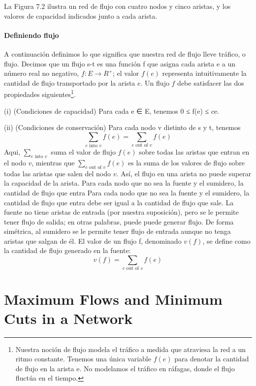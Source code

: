 \documentclass[a4paper, 12pt]{book}
\begin{document}
La Figura 7.2 ilustra un red de flujo con cuatro nodos y cinco aristas, y los valores de capacidad indicados junto a cada arista.

\paragraph{Definiendo flujo} A continuación definimos lo que significa que nuestra red de flujo lleve tráfico, o flujo.  Decimos que un flujo s-t es una función f que asigna cada arista e a un número real no negativo, $f : E \rightarrow R^+$; el valor $f(e)$ representa intuitivamente la cantidad de flujo transportado por la arista $e$. Un flujo $f$ debe satisfacer las dos propiedades siguientes\footnote{Nuestra noción de flujo modela el tráfico a medida que atraviesa la red a un ritmo constante. Tenemos una única
variable $f(e)$ para denotar la cantidad de flujo en la arista e. No modelamos el tráfico en ráfagas, donde el flujo
fluctúa en el tiempo.}.

(i) (Condiciones de capacidad) Para cada e ∈ E, tenemos 0 ≤ f(e) ≤ ce.

(ii) (Condiciones de conservación) Para cada nodo v distinto de s y t, tenemos
%
$$
\sum_{e \text { into } v} f(e)=\sum_{e \text { out of } v} f(e)
$$
%
Aqui, $\sum_{e \text { into } v}$ suma el valor de flujo $f(e)$ sobre todas las aristas que entran en el nodo $v$, mientras que $\sum_{e \text { out of } v} f(e)$ es la suma de los valores de flujo sobre todas las aristas que salen del nodo $v$.
Así, el flujo en una arista no puede superar la capacidad de la arista. Para cada nodo que no sea la fuente y el sumidero, la cantidad de flujo que entra Para cada nodo que no sea la fuente y el sumidero, la cantidad de flujo que entra debe ser igual a la cantidad de flujo que sale. La fuente no tiene aristas de entrada (por nuestra suposición), pero se le permite tener flujo de salida; en otras palabras, puede puede generar flujo. De forma simétrica, al sumidero se le permite tener flujo de entrada aunque no tenga aristas que salgan de él. El valor de un flujo f, denominado $v(f)$, se define como la cantidad de flujo generado en la fuente:
%
$$
v(f)=\sum_{e \text { out of } s} f(e)
$$
%





\section{Maximum Flows and Minimum Cuts in a Network}
\end{document}
